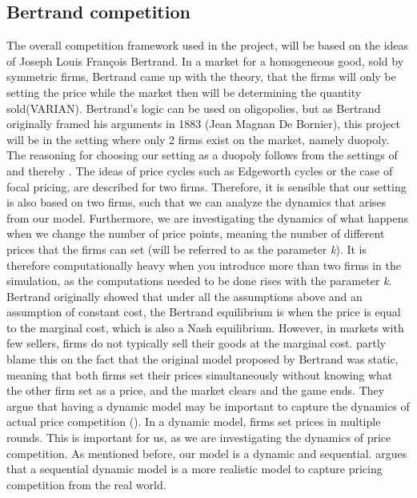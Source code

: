 \documentclass{article}
\begin{document}
\subsection{Bertrand competition}
The overall competition framework used in the project, will be based on the ideas of Joseph Louis François Bertrand. In a market for a homogeneous good, sold by symmetric firms, Bertrand came up with the theory, that the firms will only be setting the price while the market then will be determining the quantity sold(VARIAN). Bertrand's logic can be used on oligopolies, but as Bertrand originally framed his arguments in 1883 (Jean Magnan De Bornier), this project will be in the setting where only 2 firms exist on the market, namely duopoly. 
\newline
The reasoning for choosing our setting as a duopoly follows from the settings of \cite{MaskinTirole} and thereby \cite{Klein2021}. The ideas of price cycles such as Edgeworth cycles or the case of focal pricing, are described for two firms. Therefore, it is sensible that our setting is also based on two firms, such that we can analyze the dynamics that arises from our model.
Furthermore, we are investigating the dynamics of what happens when we change the number of price points, meaning the number of different prices that the firms can set (will be referred to as the parameter \textit{k}). It is therefore computationally heavy when you introduce more than two firms in the simulation, as the computations needed to be done rises with the parameter \textit{k}.  
\newline
Bertrand originally showed that under all the assumptions above and an assumption of constant cost, the Bertrand equilibrium is when the price is equal to the marginal cost, which is also a Nash equilibrium. However, in markets with few sellers, firms do not typically sell their goods at the marginal cost. 
\cite{MaskinTirole} partly blame this on the fact that the original model proposed by Bertrand was static, meaning that both firms set their prices simultaneously without knowing what the other firm set as a price, and the market clears and the game ends. They argue that having a dynamic model may be important to capture the dynamics of actual price competition (\cite{MaskinTirole}).
In a dynamic model, firms set prices in multiple rounds. This is important for us, as we are investigating the dynamics of price competition.  
\newline
As mentioned before, our model is a dynamic and sequential. \cite{Klein2021} argues that a sequential dynamic model is a more realistic model to capture pricing competition from the real world.
\end{document}

